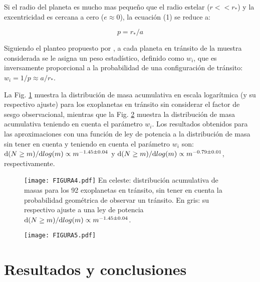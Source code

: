 \documentclass[baaa]{baaa}
\begin{document}
Si el radio del planeta es mucho mas pequeño que el radio estelar ($r<<r_{*}$) y la excentricidad es cercana a cero ($e \approx 0$), la ecuación (1) se reduce a: 

\begin{equation}
p=r_{*}/a
\end{equation} 

Siguiendo el planteo propuesto por \citet{ananyeva2020}, a cada planeta en tránsito de la muestra considerada se le asigna un peso estadístico, definido como $w_{i}$, que es inversamente proporcional
a la probabilidad de una configuración de tránsito: $w_i= 1/p \approx a/r_{*}$.

La Fig. \ref{Figura 4} muestra la distribución de masa acumulativa en escala logarítmica (y su respectivo ajuste) para los exoplanetas en tránsito sin considerar el factor de sesgo observacional, mientras que la Fig. \ref{Figura 5} muestra la distribución de masa acumulativa teniendo en cuenta el parámetro $w_i$. Los resultados obtenidos para las aproximaciones con una función de ley de potencia a la distribución de masa sin tener en cuenta y teniendo en cuenta el parámetro $w_i$ son: ${\rm d}(N\geq m)/{\rm d}log(m) \propto m^{-1.45\pm 0.04 }$ y ${\rm d}(N\geq m)/{\rm d}log(m) \propto m^{-0.79\pm 0.01 }$, respectivamente.      

\begin{figure}[!t]
\centering
\texttt{[image: FIGURA4.pdf]}
 {En celeste: distribución acumulativa de masas para los 92 exoplanetas en tránsito, sin tener en cuenta la probabilidad geométrica de observar un tránsito. En gris: su respectivo ajuste a una ley de potencia ${\rm d}(N\geq m)/{\rm d}log(m) \propto m^{-1.45\pm 0.04 }$.}
\label{Figura 4}
\end{figure}

\begin{figure}[!t]
\centering
\texttt{[image: FIGURA5.pdf]}
\label{Figura 5}
\end{figure}

\section{Resultados y conclusiones}
\end{document}
